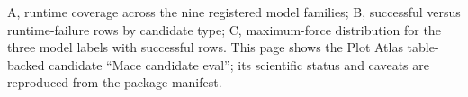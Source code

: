 A, runtime coverage across the nine registered model families; B, successful versus runtime-failure rows by candidate type; C, maximum-force distribution for the three model labels with successful rows. This page shows the Plot Atlas table-backed candidate ``Mace candidate eval''; its scientific status and caveats are reproduced from the package manifest.
